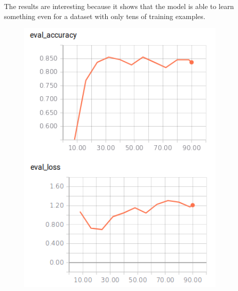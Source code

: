 The results are interesting because it shows that the model is able to learn something even for a dataset with only tens of training examples.
\begin{figure}
    \centering
    \begin{minipage}{0.30\textwidth}
        \includegraphics[width=0.9\textwidth]{figures/tensorboard_askubuntu.png}
        \caption*{}
    \end{minipage}
    \hspace*{3mm}
    \begin{minipage}{0.30\textwidth}

\end{minipage}
\end{figure}
